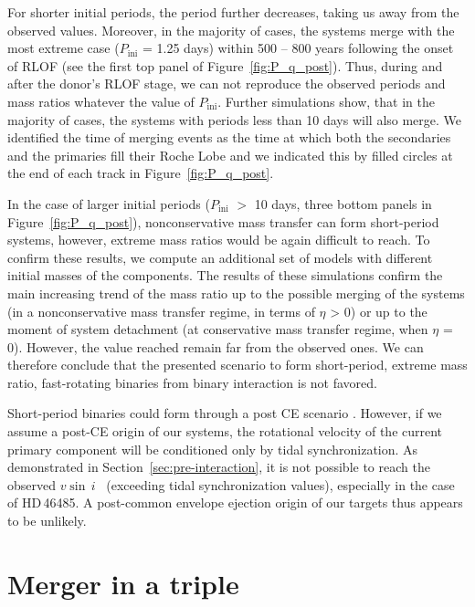 \documentclass{aa}
\newcommand{\vsini} {$v\sin\,i$}
\DeclareRobustCommand{\Figref}[1]{Figure~\ref{#1}}
\DeclareRobustCommand{\Secref}[1]{Section~\ref{#1}}
\begin{document}
For shorter initial periods, the period further decreases, taking us away from the observed values.
Moreover, in the majority of cases, the systems merge with the most extreme case ($P_\mathrm{ini}$ = 1.25 days) within 500 -- 800 years following the onset of RLOF (see the first top panel of
\Figref{fig:P_q_post}). Thus, during and after the donor's RLOF stage, we can not reproduce the observed periods and mass ratios whatever the value of $P_\mathrm{ini}$.
Further simulations show, that in the majority of cases, the systems with periods less than 10 days will also merge. We identified the time of merging events as the time at which both the secondaries and the primaries fill their Roche Lobe and we indicated this by filled circles at the end of each track in \Figref{fig:P_q_post}.

In the case of larger initial periods ($P_\mathrm{ini}$ $>$ 10 days, three bottom panels in \Figref{fig:P_q_post}), nonconservative mass transfer can form short-period systems, however, extreme mass ratios would be again difficult to reach.
To confirm these results, we compute an additional set of models with different initial masses of the components.
The results of these simulations confirm the main increasing trend of the mass ratio up to the possible merging of the systems (in a nonconservative mass transfer regime, in terms of $\eta$ > 0) or up to the moment of system detachment (at conservative mass transfer regime, when  $\eta$ = 0).
However, the value reached remain far from the observed ones.
We can therefore conclude that the presented scenario to form short-period, extreme mass ratio, fast-rotating binaries from binary interaction is not favored.


Short-period binaries could form through a
post CE scenario \citep[see channel 4 in][]{Willems_2004}.
However, if we assume a post-CE origin of our systems, the rotational velocity of the current primary component will be conditioned only by tidal synchronization. As demonstrated in \Secref{sec:pre-interaction}, it is not possible to reach the observed \vsini~ (exceeding tidal synchronization values), especially in the case of HD\,46485.
A post-common envelope ejection origin of our targets thus appears to be unlikely.




\section{Merger in a triple}
\label{sec:triple_scenario}
\end{document}
